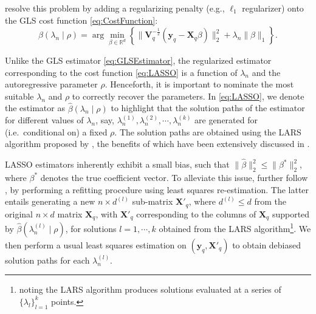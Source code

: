 \citet{10-1111rssa-12952} resolve this problem by adding a regularizing penalty (e.g., \(\ell_1\) regularizer) onto the GLS cost function \eqref{eq:CostFunction}:
\begin{equation}
\hat{\beta}(\lambda_n\mid\rho)=\arg\min_{\beta\in\mathbb{R}^d}\left\{\Big\lVert \mathbf{V}_q^{-\frac{1}{2}}(\mathbf{y}_q-\mathbf{X}_q\beta)\Big\rVert_2^2+\lambda_n\lVert \beta\rVert_1\right\}.
\label{eq:LASSO}
\end{equation}

Unlike the GLS estimator \eqref{eq:GLSEstimator}, the regularized estimator corresponding to the cost function \eqref{eq:LASSO} is a function of \(\lambda_n\) and the autoregressive parameter \(\rho\). Henceforth, it is important to nominate the most suitable \(\lambda_n\) and \(\rho\) to correctly recover the parameters. In \eqref{eq:LASSO}, we denote the estimator as \(\hat{\beta}(\lambda_n\mid\rho)\) to highlight that the solution paths of the estimator for different values of \(\lambda_n\), say, \(\lambda_n^{(1)},\lambda_n^{(2)},\cdots,\lambda_n^{(k)}\) are generated for (i.e.~conditional on) a fixed \(\rho\). The solution paths are obtained using the LARS algorithm proposed by \citet{efron2004least}, the benefits of which have been extensively discussed in \citet{10-1111rssa-12952}.

LASSO estimators inherently exhibit a small bias, such that \(\lVert \hat{\beta}\rVert_2^2\leq \lVert \beta^*\rVert_2^2\), where \(\beta^*\) denotes the true coefficient vector. To alleviate this issue, \citet{10-1111rssa-12952} further follow \citet{belloni2013least}, by performing a refitting procedure using least squares re-estimation. The latter entails generating a new \(n\times d^{(l)}\) sub-matrix \(\mathbf{X'}_q\), where \(d^{(l)}\leq d\) from the original \(n\times d\) matrix \(\mathbf{X}_q\), with \(\mathbf{X'}_q\) corresponding to the columns of \(\mathbf{X}_q\) supported by \(\hat{\beta}(\lambda_n^{(l)}\mid\rho)\), for solutions \(l=1,\cdots,k\) obtained from the LARS algorithm\footnote{noting the LARS algorithm produces solutions evaluated at a series of \(\{\lambda_l\}_{l=1}^k\) points.}. We then perform a usual least squares estimation on \((\mathbf{y}_q,\mathbf{X'}_q)\) to obtain debiased solution paths for each \(\lambda_n^{(l)}\).

